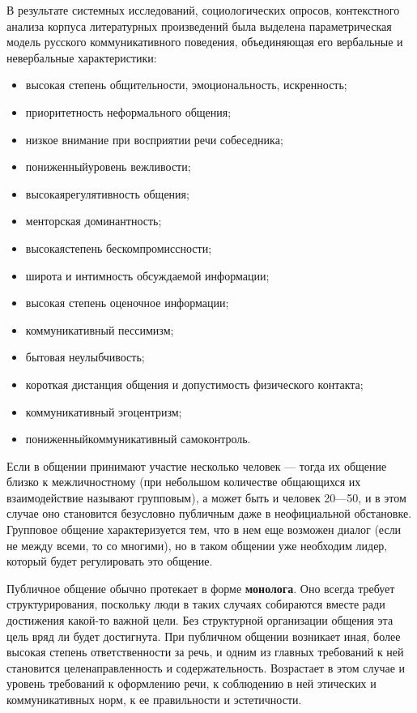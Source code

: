 В результате системных исследований, социологических опросов, контекстного анализа
 корпуса литературных произведений была выделена параметрическая модель русского коммуникативного поведения, объединяющая его вербальные и невербальные характеристики:
 \begin{itemize}[noitemsep] 
    \item высокая степень общительности, эмоциональность, искренность;
    \item приоритетность неформального общения;
    \item низкое внимание при восприятии речи собеседника;
    \item пониженныйуровень вежливости;
    \item высокаярегулятивность общения;
    \item менторская доминантность;
    \item высокаястепень бескомпромиссности;
    \item широта и интимность обсуждаемой информации;
    \item высокая степень оценочное информации;
    \item коммуникативный пессимизм;
    \item бытовая неулыбчивость;
    \item короткая дистанция общения и допустимость физического контакта;
    \item коммуникативный эгоцентризм;
    \item пониженныйкоммуникативный самоконтроль.
\end{itemize}

Если в общении принимают участие несколько человек — тогда их общение близко к межличностному (при небольшом количестве общающихся их взаимодействие называют групповым), а может быть и человек 20—50, и в этом случае оно становится безусловно публичным даже в неофициальной обстановке. Групповое общение характеризуется тем, что в нем еще возможен диалог (если не между всеми, то со многими), но в таком общении уже необходим лидер, который будет регулировать это общение.

 Публичное общение обычно протекает в форме \textbf{монолога}. Оно всегда требует структурирования, поскольку люди в таких случаях собираются вместе ради достижения какой-то важной цели. Без структурной организации общения эта цель вряд ли будет достигнута. При публичном общении возникает иная, более высокая степень ответственности за речь, и одним из главных требований к ней становится целенаправленность и содержательность. Возрастает в этом случае и уровень требований к оформлению речи, к соблюдению в ней этических и коммуникативных норм, к ее правильности и эстетичности.

